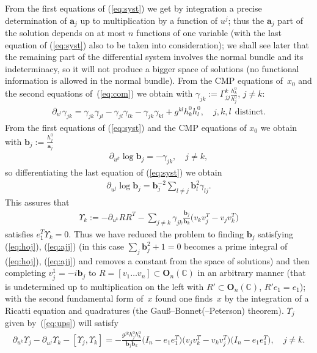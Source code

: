 \documentclass[pdftex]{sigma}
\begin{document}
From the f\/irst equations of (\ref{eq:syst}) we get by integration
a precise determination of $\mathbf{a}_j$ up to multiplication by
a function of $u^j$; thus the $\mathbf{a}_j$ part of the solution
depends on at most $n$ functions of one variable (with the last
equation of (\ref{eq:syst}) also to be taken into consideration);
we shall see later that the remaining part of the dif\/ferential
system involves the normal bundle and its indeterminacy, so it
will not produce a bigger space of solutions (no functional
information is allowed in the normal bundle). From the CMP
equations of~$x_0$ and the second equations of~(\ref{eq:com}) we
obtain with $\gamma_{jk}:=\Gamma_{jj}^k\frac{h_k^0}{h_j^0}$, $j\neq
k$:
\begin{gather}
\partial_{u^l}\gamma_{jk}=\gamma_{jk}\gamma_{jl}-\gamma_{jl}\gamma_{lk}
-\gamma_{jk}\gamma_{kl}+g^{kl}h_k^0h_l^0,\quad j,k,l\ \
\mathrm{distinct}.\label{eq:gaj}
\end{gather}
From the f\/irst equations of (\ref{eq:syst}) and the CMP equations
of $x_0$ we obtain with $\mathbf{b}_j:=\frac{h_j^0}{\mathbf{a}_j}$
\begin{gather}
\partial_{u^k}\log\mathbf{b}_j=-\gamma_{jk},\quad j\neq k,\label{eq:hoj}
\end{gather}
so dif\/ferentiating the last equation of (\ref{eq:syst}) we obtain
\begin{gather}
\partial_{u^j}\log\mathbf{b}_j=\mathbf{b}_j^{-2}\sum_{l\neq
j}\mathbf{b}_l^2\gamma_{lj}.\label{eq:ajj}
\end{gather}
This assures that
\begin{gather}
\Upsilon_k:=-\partial_{u^k}RR^T-\sum_{j\neq
k}\gamma_{jk}\frac{\mathbf{b}_j}{\mathbf{b}_k}\big(v_kv_j^T-v_jv_k^T\big)\label{eq:ups}
\end{gather}
satisf\/ies $e_1^T\Upsilon_k=0$. Thus we have reduced the problem to
f\/inding $\mathbf{b}_j$ satisfying (\ref{eq:hoj}), (\ref{eq:ajj})
(in this case $\sum_j\mathbf{b}_j^2+1=0$ becomes a prime integral
of (\ref{eq:hoj}), (\ref{eq:ajj}) and removes a constant from the
space of solutions) and then completing $v_j^1=-i\mathbf{b}_j$ to
$R=[v_1\dots v_n]\subset\mathbf{O}_n(\mathbb{C})$ in an arbitrary
manner (that is undetermined up to multiplication on the left with
$R'\subset\mathbf{O}_n(\mathbb{C})$, $R'e_1=e_1$); with the second
fundamental form of~$x$ found one f\/inds~$x$ by the integration of
a Ricatti equation and quadratures (the Gau\ss--Bonnet(--Peterson)
theorem). $\Upsilon_j$ given by~(\ref{eq:ups}) will satisfy
\begin{gather}
\partial_{u^k}\Upsilon_j-\partial_{u^j}\Upsilon_k-[\Upsilon_j,\Upsilon_k]
=-\frac{g^{jk}h_j^0h_k^0}{\mathbf{b}_j\mathbf{b}_k}\big(I_n-e_1e_1^T\big)\big(v_jv_k^T-v_kv_j^T\big)
\big(I_n-e_1e_1^T\big),\!\quad j\neq k.\!\!\!\label{eq:upsj}
\end{gather}
\end{document}
